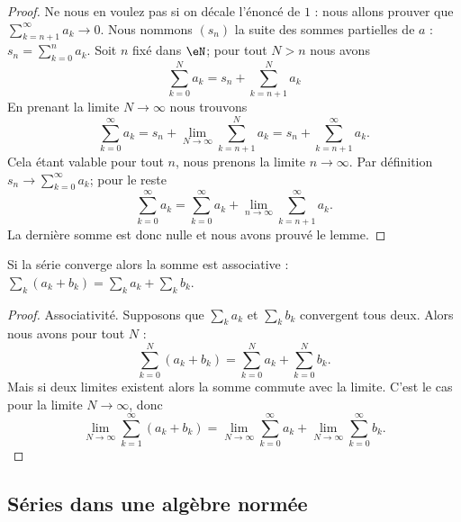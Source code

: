 \begin{proof}
    Ne nous en voulez pas si on décale l'énoncé de \( 1\) : nous allons prouver que \( \sum_{k=n+1}^{\infty}a_k\to 0\). Nous nommons \( (s_n)\) la suite des sommes partielles de \( a\) : \( s_n=\sum_{k=0}^na_k\). Soit \( n\) fixé dans \( \eN\); pour tout \( N>n\) nous avons
    \begin{equation}
        \sum_{k=0}^Na_k=s_n+\sum_{k=n+1}^Na_k
    \end{equation}
    En prenant la limite \( N\to \infty\) nous trouvons
    \begin{equation}
        \sum_{k=0}^{\infty}a_k=s_n+\lim_{N\to \infty} \sum_{k=n+1}^Na_k=s_n+\sum_{k=n+1}^{\infty}a_k.
    \end{equation}
    Cela étant valable pour tout \( n\), nous prenons la limite \( n\to\infty\). Par définition \( s_n\to\sum_{k=0}^{\infty}a_k\); pour le reste
    \begin{equation}
        \sum_{k=0}^{\infty}a_k=\sum_{k=0}^{\infty}a_k+\lim_{n\to \infty} \sum_{k=n+1}^{\infty}a_k.
    \end{equation}
    La dernière somme est donc nulle et nous avons prouvé le lemme.
\end{proof}

\begin{proposition}     \label{PROPooUEBWooUQBQvP}
	Si la série converge alors la somme est associative :
	\( \sum_k (a_k+b_k) = \sum_k a_k + \sum_k b_k \).
\end{proposition}

\begin{proof}
	Associativité. Supposons que \( \sum_ka_k\) et \( \sum_kb_k\) convergent tous deux. Alors nous avons pour tout \( N\) :
	\begin{equation}
		\sum_{k=0}^N(a_k+b_k)=\sum_{k=0}^Na_k+\sum_{k=0}^Nb_k.
	\end{equation}
	Mais si deux limites existent alors la somme commute avec la limite. C'est le cas pour la limite \( N\to \infty\), donc
	\begin{equation}
		\lim_{N\to \infty} \sum_{k=1}^{\infty}(a_k+b_k)=\lim_{N\to \infty} \sum_{k=0}^{\infty}a_k+\lim_{N\to \infty} \sum_{k=0}^{\infty}b_k.
	\end{equation}
\end{proof}


\subsection{Séries dans une algèbre normée}

